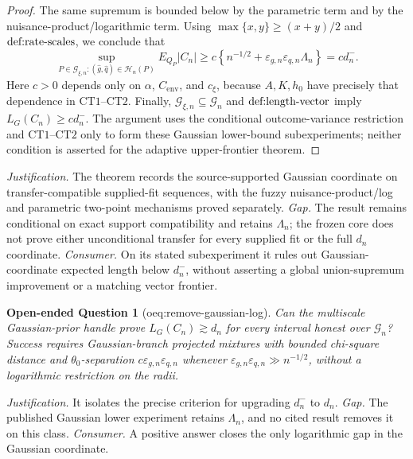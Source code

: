 \documentclass{article}
\newtheorem{openendedquestion}{Open-ended Question}
\begin{document}
\begin{proof}
The same supremum is bounded below by the parametric term and by the nuisance-product/logarithmic term.  Using \(\max\{x,y\}\ge(x+y)/2\) and \(\textup{def:rate-scales}\), we conclude that
\[
 \sup_{P\in\mathcal G_{\xi,n}:(\widehat g,\widehat q)\in\mathcal H_n(P)}
 E_{Q_P}|C_n|
 \ge c\left\{n^{-1/2}
 +\varepsilon_{g,n}\varepsilon_{q,n}\Lambda_n\right\}
 =c d_n^-.
\]
Here \(c>0\) depends only on \(\alpha\), \(C_{\mathrm{env}}\), and \(c_\xi\), because \(A,K,h_0\) have precisely that dependence in \(\mathrm{CT1}\)--\(\mathrm{CT2}\).  Finally, \(\mathcal G_{\xi,n}\subseteq\mathcal G_n\) and \(\textup{def:length-vector}\) imply \(L_G(C_n)\ge c d_n^-\).  The argument uses the conditional outcome-variance restriction and \(\mathrm{CT1}\)--\(\mathrm{CT2}\) only to form these Gaussian lower-bound subexperiments; neither condition is asserted for the adaptive upper-frontier theorem.
\end{proof}
\par\smallskip\noindent \textit{Justification.} The theorem records the source-supported Gaussian coordinate on transfer-compatible supplied-fit sequences, with the fuzzy nuisance-product/log and parametric two-point mechanisms proved separately. \textit{Gap.} The result remains conditional on exact support compatibility and retains \(\Lambda_n\); the frozen core does not prove either unconditional transfer for every supplied fit or the full \(d_n\) coordinate. \textit{Consumer.} On its stated subexperiment it rules out Gaussian-coordinate expected length below \(d_n^-\), without asserting a global union-supremum improvement or a matching vector frontier.

\begin{openendedquestion}[oeq:remove-gaussian-log]\label{oeq:remove-gaussian-log}
Can the multiscale Gaussian-prior handle prove \(L_G(C_n)\gtrsim d_n\) for every interval honest over \(\mathcal G_n\)? Success requires Gaussian-branch projected mixtures with bounded chi-square distance and \(\theta_0\)-separation \(c\varepsilon_{g,n}\varepsilon_{q,n}\) whenever \(\varepsilon_{g,n}\varepsilon_{q,n}\gg n^{-1/2}\), without a logarithmic restriction on the radii.
\end{openendedquestion}
\par\smallskip\noindent \textit{Justification.} It isolates the precise criterion for upgrading \(d_n^-\) to \(d_n\). \textit{Gap.} The published Gaussian lower experiment retains \(\Lambda_n\), and no cited result removes it on this class. \textit{Consumer.} A positive answer closes the only logarithmic gap in the Gaussian coordinate.
\end{document}
